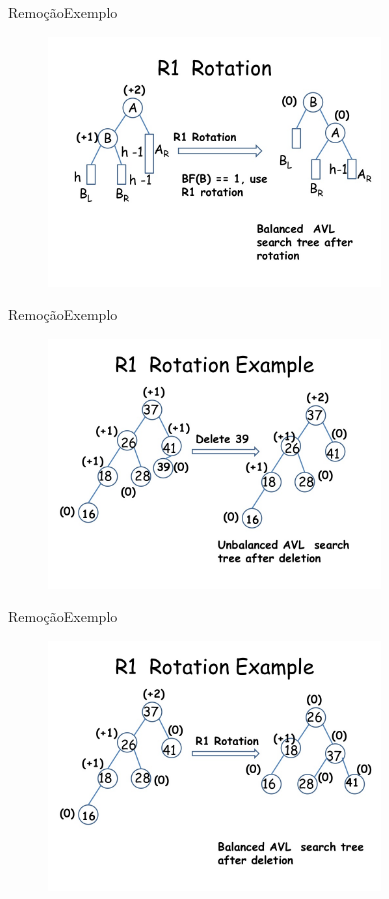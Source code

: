 \documentclass[aspectratio=169]{beamer}
\begin{document}

\begin{frame}{Remoção}{Exemplo}
\begin{figure}[!h]
  \centering
  \includegraphics[width=250pt]{imagens/exemplo_remocao6.png}
  \label{fig_exemplo_remocao6}
\end{figure}
\end{frame}


\begin{frame}{Remoção}{Exemplo}
\begin{figure}[!h]
  \centering
  \includegraphics[width=250pt]{imagens/exemplo_remocao7.png}
  \label{fig_exemplo_remocao7}
\end{figure}
\end{frame}


\begin{frame}{Remoção}{Exemplo}
\begin{figure}[!h]
  \centering
  \includegraphics[width=250pt]{imagens/exemplo_remocao8.png}
  \label{fig_exemplo_remocao8}
\end{figure}
\end{frame}
\end{document}
